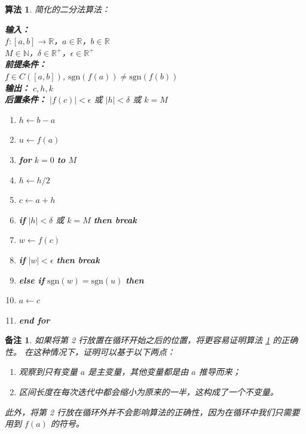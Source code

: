 \documentclass[a4paper]{ctexart}
\newtheorem{remark}{备注}
\newtheorem{algorithm}[theorem]{算法}
\numberwithin{theorem}{section}
\numberwithin{equation}{section}
\numberwithin{figure}{section}
\numberwithin{remark}{section}
\begin{document}
\begin{algorithm}
    \label{alg::simple_bisection}
简化的二分法算法：

\begin{minipage}{0.45\textwidth}
\textbf{输入：} \\
$f : [a,b] \rightarrow \mathbb{R}$，$a \in \mathbb{R}$，$b \in \mathbb{R}$ \\
$M \in \mathbb{N}$，$\delta \in \mathbb{R}^+$，$\epsilon \in \mathbb{R}^+$ \\
\textbf{前提条件：} \\
$f \in C([a,b])$, $\text{sgn}(f(a)) \neq \text{sgn}(f(b))$ \\
\textbf{输出：} $c, h, k$ \\
\textbf{后置条件：} $|f(c)| < \epsilon$ 或 $|h| < \delta$ 或 $k = M$
\end{minipage}

\begin{enumerate}
\item $h \leftarrow b - a$
\item $u \leftarrow f(a)$
\item \textbf{for} $k = 0$ \textbf{to} $M$
\item \quad $h \leftarrow h / 2$
\item \quad $c \leftarrow a + h$
\item \quad \textbf{if} $|h| < \delta$ 或 $k = M$ \textbf{then break}
\item \quad $w \leftarrow f(c)$
\item \quad \textbf{if} $|w| < \epsilon$ \textbf{then break}
\item \quad \textbf{else if} $\text{sgn}(w) = \text{sgn}(u)$ \textbf{then}
\item \qquad $a \leftarrow c$
\item \textbf{end for}
\end{enumerate}
    
\end{algorithm}

\begin{remark}
如果将第 2 行放置在循环开始之后的位置，将更容易证明算法 \ref{alg::simple_bisection} 的正确性。
在这种情况下，证明可以基于以下两点：
\begin{enumerate}
    \item 观察到只有变量 \(a\) 是主变量，其他变量都是由 \(a\) 推导而来；
    \item 区间长度在每次迭代中都会缩小为原来的一半，这构成了一个不变量。
\end{enumerate}
此外，将第 2 行放在循环外并不会影响算法的正确性，因为在循环中我们只需要用到 \(f(a)\) 的符号。
\end{remark}
\end{document}
